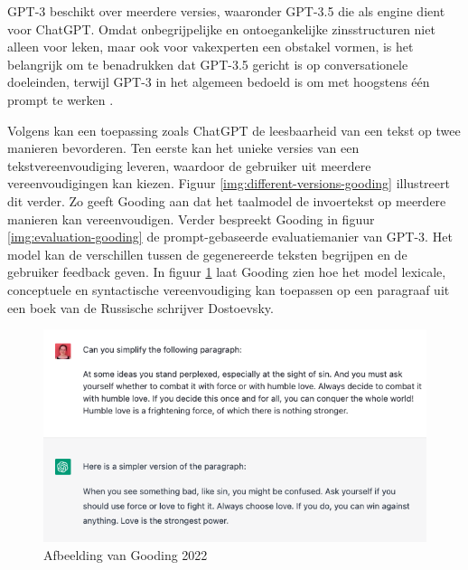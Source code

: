 GPT-3 beschikt over meerdere versies, waaronder GPT-3.5 die als engine dient voor ChatGPT. Omdat onbegrijpelijke en ontoegankelijke zinsstructuren niet alleen voor leken, maar ook voor vakexperten een obstakel vormen, is het belangrijk om te benadrukken dat GPT-3.5 gericht is op conversationele doeleinden, terwijl GPT-3 in het algemeen bedoeld is om met hoogstens één prompt te werken \autocite{McNutt2014, Hubbard2017}.

\medspace

Volgens \textcite{Gooding2022} kan een toepassing zoals ChatGPT de leesbaarheid van een tekst op twee manieren bevorderen. Ten eerste kan het unieke versies van een tekstvereenvoudiging leveren, waardoor de gebruiker uit meerdere vereenvoudigingen kan kiezen. Figuur \ref{img:different-versions-gooding} illustreert dit verder.  Zo geeft Gooding aan dat het taalmodel de invoertekst op meerdere manieren kan vereenvoudigen. Verder bespreekt Gooding in figuur \ref{img:evaluation-gooding} de prompt-gebaseerde evaluatiemanier van GPT-3. Het model kan de verschillen tussen de gegenereerde teksten begrijpen en de gebruiker feedback geven. In figuur \ref{img:simplification-gooding} laat Gooding zien hoe het model lexicale, conceptuele en syntactische vereenvoudiging kan toepassen op een paragraaf uit een boek van de Russische schrijver Dostoevsky.

\begin{figure}[H]
	\includegraphics[width=\linewidth]{img/chatgpt-example-simplification-gooding.png}
	\caption{Afbeelding van Gooding 2022}
	\label{img:simplification-gooding}
\end{figure}

